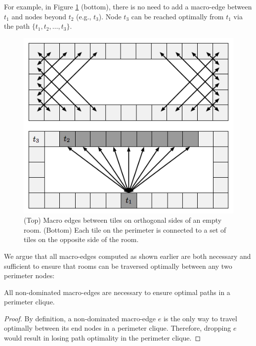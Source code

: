 For example, in Figure \ref{fig-macroedges} (bottom), there is no need to add a macro-edge between $t_1$
and nodes beyond $t_2$ (e.g., $t_3$). Node $t_3$ can be reached optimally from $t_1$ via the path
$\lbrace t_1, t_2, \dots, t_3 \rbrace$.

\begin{figure}[tb]
       \begin{center}
                       \includegraphics[scale=0.5, trim = 10mm 10mm 10mm 0mm]{diagrams/macroedges.png}
       \end{center}
	\vspace{-3pt}
       \caption{(Top) Macro edges between tiles on orthogonal sides of an empty room. 
(Bottom) Each tile on the perimeter is connected to a set of tiles on the opposite side of the room.}
       \label{fig-macroedges}
\end{figure}

We argue that all macro-edges computed as shown earlier are both necessary and sufficient
to ensure that rooms can be traversed optimally between any two perimeter nodes:

\begin{proposition}
All non-dominated macro-edges are necessary to ensure optimal paths in a perimeter clique.
\end{proposition}
\begin{proof}
By definition, a non-dominated macro-edge $e$ is the only way to travel optimally between 
its end nodes in a perimeter clique. Therefore, dropping $e$ would result in losing path optimality
in the perimeter clique.
\end{proof}

